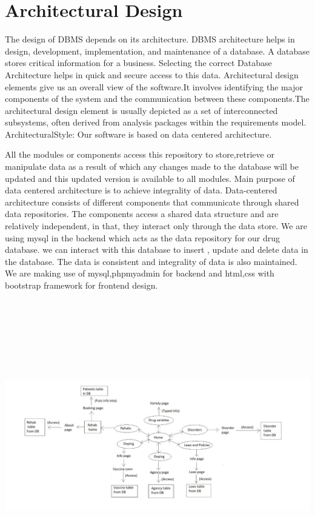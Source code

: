 \documentclass{report}
\begin{document}
\section{Architectural Design}
The design of DBMS depends on its architecture. DBMS architecture helps in design, development, implementation, and maintenance of a database. A database stores critical information for a business. Selecting the correct Database Architecture helps in quick and secure access to this data.
Architectural design elements give us an overall view of the software.It involves identifying
the major components of the system and the communication between these components.The architectural design element is usually depicted as a set of interconnected subsystems, often derived from analysis packages within the requirements model. ArchitecturalStyle: Our software is based on data centered architecture.

 All the modules or components access this repository to store,retrieve or manipulate data as a result of which any changes made to the database will be updated and this updated version is available to all modules. Main purpose of data centered architecture is to achieve integrality of data. Data-centered architecture consists of different components that communicate through shared data repositories. The components access a shared data structure and are relatively independent, in that, they interact only through the data store.
We are using mysql in the backend which acts as the data repository for our drug database. we can interact with this database to insert , update and delete data in the database. The data is consistent and integrality of data is also maintained. We are making use of mysql,phpmyadmin for backend and html,css with bootstrap framework for frontend design.
\centerline{\includegraphics[width=7in,height=5in,keepaspectratio]{design1}}\\
\end{document}

